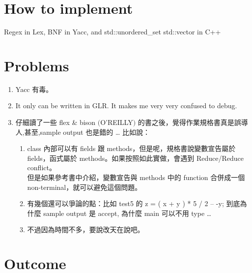 \documentclass[12pt,a4paper]{article}
\begin{document}
\begin{CJK}{UTF8}{bsmi}
    \section{How to implement}
    Regex in Lex, BNF in Yacc, and std::unordered\_set std::vector in C++

    \section{Problems}
    \begin{enumerate}
        \item Yacc 有毒。
        \item It only can be written in GLR. It makes me very very confused to debug.
        \item 仔細讀了一些 flex \& bison $($O'REILLY$)$ 的書之後，覺得作業規格書真是誤導人,甚至,sample output 也是錯的 \dots
              比如說：\begin{enumerate}
                  \item class 內部可以有 fields 跟 methods，但是呢，規格書說變數宣告屬於 fields，函式屬於 methods。如果按照如此實做，會遇到 Reduce/Reduce conflict。\\
                        但是如果參考書中介紹，變數宣告與 methods 中的 function 合併成一個 non-terminal，就可以避免這個問題。
                  \item 有幾個還可以爭論的點：比如 test5 的 z = ( x + y ) * 5 / 2 -- -y; 到底為什麼 sample output 是 accept, 為什麼 main 可以不用 type \dots
                  \item 不過因為時間不多，要說改天在說吧。
              \end{enumerate}
    \end{enumerate}

    \section{Outcome}
    

\end{CJK}
\end{document}
